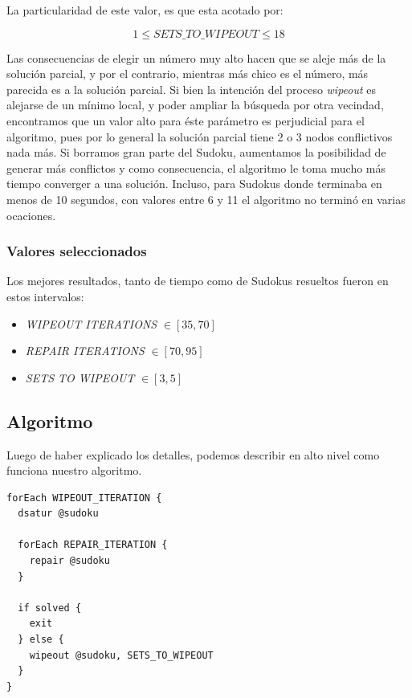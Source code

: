 \documentclass[a4paper,spanish]{article}
\begin{document}
La particularidad de este valor, es que esta acotado por: 

\begin{equation}
	1 \leq SETS\_TO\_WIPEOUT \leq 18
\end{equation}

Las consecuencias de elegir un número muy alto hacen que se aleje más de la solución parcial,
y por el contrario, mientras más chico es el número, más parecida es a la solución parcial.
Si bien la intención del proceso \emph{wipeout} es alejarse de un mínimo local, y poder ampliar
la búsqueda por otra vecindad, encontramos que un valor alto para éste parámetro es perjudicial
para el algoritmo, pues por lo general la solución parcial tiene 2 o 3 nodos conflictivos nada más.
Si borramos gran parte del Sudoku, aumentamos la posibilidad de generar más conflictos y como
consecuencia, el algoritmo le toma mucho más tiempo converger a una solución. Incluso, para
Sudokus donde terminaba en menos de 10 segundos, con valores entre 6 y 11 el algoritmo no
terminó en varias ocaciones.

\subsubsection{Valores seleccionados}

Los mejores resultados, tanto de tiempo como de Sudokus resueltos fueron en estos intervalos:

\begin{itemize}
	\item \emph{WIPEOUT ITERATIONS} $\in [35, 70]$
	\item \emph{REPAIR ITERATIONS} $\in [70, 95]$
	\item \emph{SETS TO WIPEOUT} $\in [3, 5]$
\end{itemize}

\subsection{Algoritmo}

Luego de haber explicado los detalles, podemos describir en alto nivel como funciona nuestro
algoritmo.


\begin{verbatim}
forEach WIPEOUT_ITERATION {
  dsatur @sudoku
		
  forEach REPAIR_ITERATION {
    repair @sudoku  
  }

  if solved {
    exit
  } else {
    wipeout @sudoku, SETS_TO_WIPEOUT
  }
}
\end{verbatim}
\end{document}
